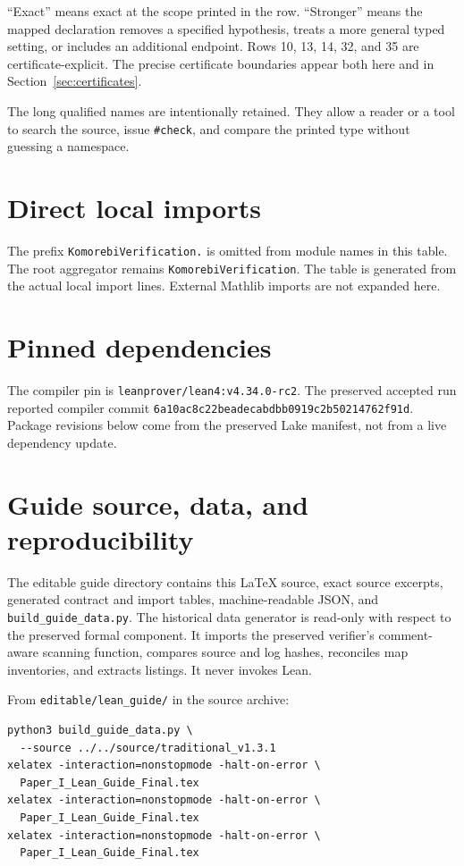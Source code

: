 \documentclass[11pt,a4paper]{article}
\newcommand{\code}[1]{\nolinkurl{#1}}
\begin{document}
``Exact'' means exact at the scope printed in the row. ``Stronger'' means the mapped declaration removes a specified hypothesis, treats a more general typed setting, or includes an additional endpoint. Rows 10, 13, 14, 32, and 35 are certificate-explicit. The precise certificate boundaries appear both here and in Section~\ref{sec:certificates}.

The long qualified names are intentionally retained. They allow a reader or a tool to search the source, issue \texttt{\#check}, and compare the printed type without guessing a namespace.


\clearpage
\appendix
\section{Direct local imports}\label{app:imports}
The prefix \code{KomorebiVerification.} is omitted from module names in this table. The root aggregator remains \code{KomorebiVerification}. The table is generated from the actual local import lines. External Mathlib imports are not expanded here.
{\small}

\section{Pinned dependencies}\label{app:pins}
The compiler pin is \code{leanprover/lean4:v4.34.0-rc2}. The preserved accepted run reported compiler commit \code{6a10ac8c22beadecabdbb0919c2b50214762f91d}. Package revisions below come from the preserved Lake manifest, not from a live dependency update.


\clearpage
\section{Guide source, data, and reproducibility}

The editable guide directory contains this \LaTeX{} source, exact source excerpts, generated contract and import tables, machine-readable JSON, and \code{build_guide_data.py}. The historical data generator is read-only with respect to the preserved formal component. It imports the preserved verifier's comment-aware scanning function, compares source and log hashes, reconciles map inventories, and extracts listings. It never invokes Lean.

From \code{editable/lean_guide/} in the source archive:
\begin{lstlisting}
python3 build_guide_data.py \
  --source ../../source/traditional_v1.3.1
xelatex -interaction=nonstopmode -halt-on-error \
  Paper_I_Lean_Guide_Final.tex
xelatex -interaction=nonstopmode -halt-on-error \
  Paper_I_Lean_Guide_Final.tex
xelatex -interaction=nonstopmode -halt-on-error \
  Paper_I_Lean_Guide_Final.tex
\end{lstlisting}
\end{document}
